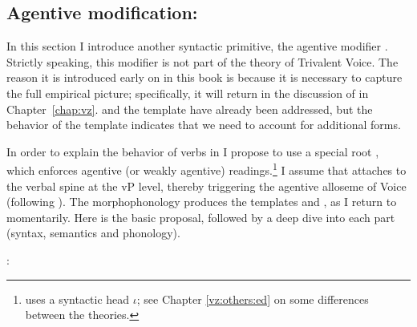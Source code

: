 \begin{exe}
\begin{xlist}
\begin{exe}
\begin{xlist}
\begin{exe}
\begin{xlist}
\begin{exe}
\begin{exe}
\begin{xlist}
\begin{exe}
\begin{xlist}
\begin{exe}
\begin{xlist}
\begin{exe}
\begin{xlist}
\begin{exe}
\begin{xlist}
\begin{exe}
\begin{xlist}
\begin{exe}
\begin{xlist}
\begin{exe}
\begin{xlist}
\begin{exe}
\begin{xlist}
\begin{exe}
\begin{xlist}
\begin{exe}
\begin{xlist}
\begin{exe}
\begin{xlist}
\begin{exe}
\begin{exe}
\begin{xlist}
\begin{exe}
\begin{xlist}
\begin{exe}
\begin{xlist}
\begin{exe}
\begin{xlist}
{\begin{exe}
\begin{xlist}
\begin{exe}
\begin{xlist}
\begin{exe}
\begin{xlist}
\begin{exe}
\begin{xlist}
\begin{xlist}
\begin{xlist}
\begin{exe}
\begin{xlist}
\begin{xlist}
\begin{xlist}
\begin{exe}
\begin{exe}
\begin{xlist}
\begin{exe}
\begin{xlist}
\begin{exe}
\begin{xlist}
\begin{exe}
\begin{xlist}
\begin{exe}
\begin{xlist}
\begin{exe}
\begin{xlist}
\begin{exe}
\begin{exe}
\begin{xlist}
\begin{xlist}
\begin{exe}
\begin{xlist}
\begin{exe}
\begin{xlist}
\begin{exe}
\begin{xlist}
\begin{exe}
\begin{xlist}
\section{Agentive modification: \va} \label{voice:va}
In this section I introduce another syntactic primitive, the agentive modifier {\va}. Strictly speaking, this modifier is not part of the theory of Trivalent Voice. The reason it is introduced early on in this book is because it is necessary to capture the full empirical picture; specifically, it will return in the discussion of {\vz} in Chapter~\ref{chap:vz}.  and the template {\tkal} have already been addressed, but the behavior of the template {\tpie} indicates that we need to account for additional forms.

In order to explain the behavior of verbs in {\tpie} I propose to use a special root {\va}, which enforces agentive (or weakly agentive) readings.\footnote{\cite{doron03} uses a syntactic head $\iota$; see Chapter \ref{vz:others:ed} on some differences between the theories.} I assume that {\va} attaches to the verbal spine at the vP level, thereby triggering the agentive alloseme of Voice (following \citealt{doron03,doron14adj}). The morphophonology produces the templates {\tpie} and {\thit}, as I return to momentarily. Here is the basic proposal, followed by a deep dive into each part (syntax, semantics and phonology).
 \begin{exe}
 \ex  {\va}: 

\end{exe}
\end{xlist}
\end{exe}
\end{xlist}
\end{exe}
\end{xlist}
\end{exe}
\end{xlist}
\end{exe}
\end{xlist}
\end{xlist}
\end{exe}
\end{exe}
\end{xlist}
\end{exe}
\end{xlist}
\end{exe}
\end{xlist}
\end{exe}
\end{xlist}
\end{exe}
\end{xlist}
\end{exe}
\end{xlist}
\end{exe}
\end{exe}
\end{xlist}
\end{xlist}
\end{xlist}
\end{exe}
\end{xlist}
\end{xlist}
\end{xlist}
\end{exe}
\end{xlist}
\end{exe}
\end{xlist}
\end{exe}
\end{xlist}
\end{exe}}
\end{xlist}
\end{exe}
\end{xlist}
\end{exe}
\end{xlist}
\end{exe}
\end{xlist}
\end{exe}
\end{exe}
\end{xlist}
\end{exe}
\end{xlist}
\end{exe}
\end{xlist}
\end{exe}
\end{xlist}
\end{exe}
\end{xlist}
\end{exe}
\end{xlist}
\end{exe}
\end{xlist}
\end{exe}
\end{xlist}
\end{exe}
\end{xlist}
\end{exe}
\end{xlist}
\end{exe}
\end{xlist}
\end{exe}
\end{xlist}
\end{exe}
\end{exe}
\end{xlist}
\end{exe}
\end{xlist}
\end{exe}
\end{xlist}
\end{exe}
